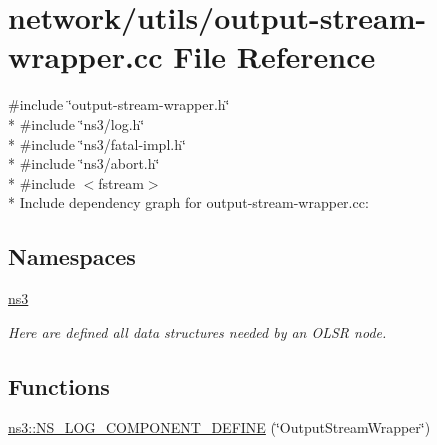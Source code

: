 \hypertarget{output-stream-wrapper_8cc}{}\section{network/utils/output-\/stream-\/wrapper.cc File Reference}
\label{output-stream-wrapper_8cc}
{\ttfamily \#include \char`\"{}output-\/stream-\/wrapper.\+h\char`\"{}}\\*
{\ttfamily \#include \char`\"{}ns3/log.\+h\char`\"{}}\\*
{\ttfamily \#include \char`\"{}ns3/fatal-\/impl.\+h\char`\"{}}\\*
{\ttfamily \#include \char`\"{}ns3/abort.\+h\char`\"{}}\\*
{\ttfamily \#include $<$fstream$>$}\\*
Include dependency graph for output-\/stream-\/wrapper.cc\+:
\subsection*{Namespaces}
\begin{DoxyCompactItemize}
\item 
 \hyperlink{namespacens3}{ns3}
\begin{DoxyCompactList}\small\item\em Here are defined all data structures needed by an O\+L\+SR node. \end{DoxyCompactList}\end{DoxyCompactItemize}
\subsection*{Functions}
\begin{DoxyCompactItemize}
\item 
\hyperlink{namespacens3_a2bea58a365f2a75b832be2eb49d47751}{ns3\+::\+N\+S\+\_\+\+L\+O\+G\+\_\+\+C\+O\+M\+P\+O\+N\+E\+N\+T\+\_\+\+D\+E\+F\+I\+NE} (\char`\"{}Output\+Stream\+Wrapper\char`\"{})
\end{DoxyCompactItemize}
